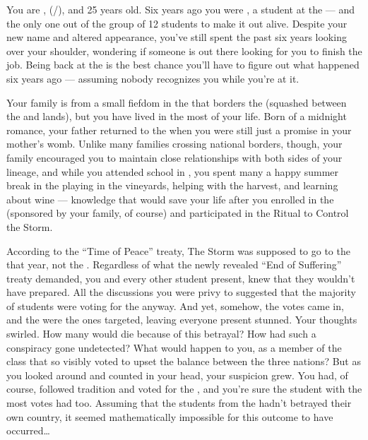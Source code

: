 \documentclass[char]{GL2020}
\begin{document}
\name{\cAssistantScientist{}}

You are \cAssistantScientist{\intro}, (\cAssistantScientist{\they}/\cAssistantScientist{\them}), and 25 years old. Six years ago you were \textbf{\cKidScientist{\intro}}, a student at the \pSchool{} — and the only one out of the group of 12 students to make it out alive. Despite your new name and altered appearance, you've still spent the past six years looking over your shoulder, wondering if someone is out there looking for you to finish the job. Being back at the \pSc{} is the best chance you'll have to figure out what happened six years ago — assuming nobody recognizes you while you're at it.

Your family is from a small fiefdom in the \pFarm{} that borders the \pTech{} (squashed between the \cWildCard{\formal} and \cChupStudent{\formal} lands), but you have lived in the \pTech{} most of your life. Born of a midnight romance, your father returned to the \pTech{} when you were still just a promise in your mother's womb. Unlike many families crossing national borders, though, your family encouraged you to maintain close relationships with both sides of your lineage, and while you attended school in \pTech{}, you spent many a happy summer break in the \pFarm{} playing in the vineyards, helping with the harvest, and learning about wine — knowledge that would save your life after you enrolled in the \pSc{} (sponsored by your \pFarm{} family, of course) and participated in the Ritual to Control the Storm.

According to the ``Time of Peace'' treaty, The Storm was supposed to go to the \pTech{} that year, not the \pShip{}. Regardless of what the newly revealed ``End of Suffering'' treaty demanded, you and every other student present, knew that they wouldn't have prepared. All the discussions you were privy to suggested that the majority of students were voting for the \pTech{} anyway. And yet, somehow, the votes came in, and the \pShip{} were the ones targeted, leaving everyone present stunned. Your thoughts swirled. How many would die because of this betrayal? How had such a conspiracy gone undetected? What would happen to you, as a member of the class that so visibly voted to upset the balance between the three nations? But as you looked around and counted in your head, your suspicion grew. You had, of course, followed tradition and voted for the \pTech{}, and you're sure the \pFarm{} student with the most votes had too. Assuming that the students from the \pShip{} hadn't betrayed their own country, it seemed mathematically impossible for this outcome to have occurred\ldots{}
\end{document}
